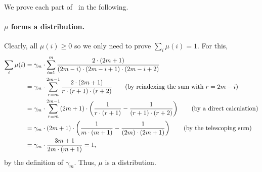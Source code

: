 We prove each part of~ in the following. 

\paragraph{$\mu$ forms a distribution.} Clearly, all $\mu(i) \geq 0$ so we only need to prove $\sum_i \mu(i)=1$. For this, 
\begin{align*}
	\sum_i \mu(i) &= \gamma_m \cdot \sum_{i=1}^{m}  \frac{2 \cdot (2m+1)}{(2m-i)\cdot(2m-i+1)\cdot(2m-i+2)} \\
	&= \gamma_m \cdot \sum_{r=m}^{2m-1} \frac{2 \cdot (2m+1)}{r \cdot (r+1)\cdot(r+2)} \tag{by reindexing the sum with $r=2m-i$} \\
	&= \gamma_m \cdot \sum_{r=m}^{2m-1} (2m+1) \cdot \left(\frac{1}{r \cdot (r+1)} - \frac{1}{(r+1)\cdot(r+2)}\right) \tag{by a direct calculation} \\
	&= \gamma_m \cdot (2m+1) \cdot \left(\frac{1}{m \cdot (m+1)} - \frac{1}{(2m)\cdot(2m+1)}\right) \tag{by the telescoping sum} \\
	&= \gamma_m \cdot \frac{3m+1}{2m \cdot (m+1)} = 1, 
\end{align*}
by the definition of $\gamma_m$. Thus, $\mu$ is a distribution. 

